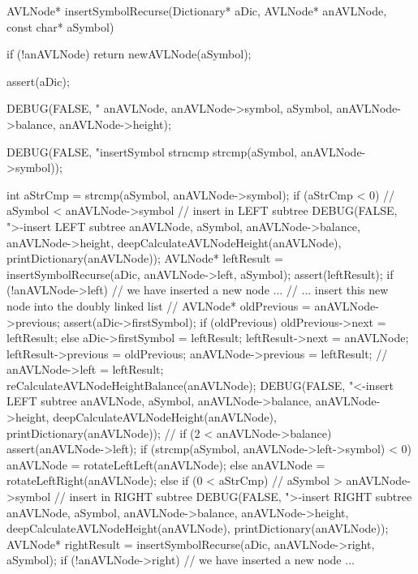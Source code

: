 AVLNode* insertSymbolRecurse(Dictionary* aDic,
                             AVLNode* anAVLNode,
                             const char* aSymbol) {
  if (!anAVLNode) return newAVLNode(aSymbol);

  assert(aDic);

  DEBUG(FALSE, "\ninsertSymbol %
        anAVLNode, anAVLNode->symbol, aSymbol,
        anAVLNode->balance, anAVLNode->height);

  DEBUG(FALSE, "insertSymbol strncmp %
        strcmp(aSymbol, anAVLNode->symbol));

  int aStrCmp = strcmp(aSymbol, anAVLNode->symbol);
  if (aStrCmp < 0) {
    // aSymbol < anAVLNode->symbol // insert in LEFT subtree
    DEBUG(FALSE, ">-insert LEFT subtree %
          anAVLNode, aSymbol, anAVLNode->balance,
          anAVLNode->height, deepCalculateAVLNodeHeight(anAVLNode),
          printDictionary(anAVLNode));
    AVLNode* leftResult =
      insertSymbolRecurse(aDic, anAVLNode->left, aSymbol);
    assert(leftResult);
    if (!anAVLNode->left) {
      // we have inserted a new node ...
      // ... insert this new node into the doubly linked list
      //
      AVLNode* oldPrevious               = anAVLNode->previous;
      assert(aDic->firstSymbol);
      if (oldPrevious) oldPrevious->next = leftResult;
      else aDic->firstSymbol             = leftResult;
      leftResult->next                   = anAVLNode;
      leftResult->previous               = oldPrevious;
      anAVLNode->previous                = leftResult;
      //
    }
    anAVLNode->left = leftResult;
    reCalculateAVLNodeHeightBalance(anAVLNode);
    DEBUG(FALSE, "<-insert LEFT subtree %
          anAVLNode, aSymbol, anAVLNode->balance,
          anAVLNode->height, deepCalculateAVLNodeHeight(anAVLNode),
          printDictionary(anAVLNode));
    //
    if (2 < anAVLNode->balance) {
      assert(anAVLNode->left);
      if (strcmp(aSymbol, anAVLNode->left->symbol) < 0) {
        anAVLNode = rotateLeftLeft(anAVLNode);
      } else {
        anAVLNode = rotateLeftRight(anAVLNode);
      }
    }
  } else if (0 < aStrCmp) {
    // aSymbol > anAVLNode->symbol // insert in RIGHT subtree
    DEBUG(FALSE, ">-insert RIGHT subtree %
        anAVLNode, aSymbol, anAVLNode->balance,
        anAVLNode->height, deepCalculateAVLNodeHeight(anAVLNode),
        printDictionary(anAVLNode));
    AVLNode* rightResult =
      insertSymbolRecurse(aDic, anAVLNode->right, aSymbol);
    if (!anAVLNode->right) {
      // we have inserted a new node ...
}}}
